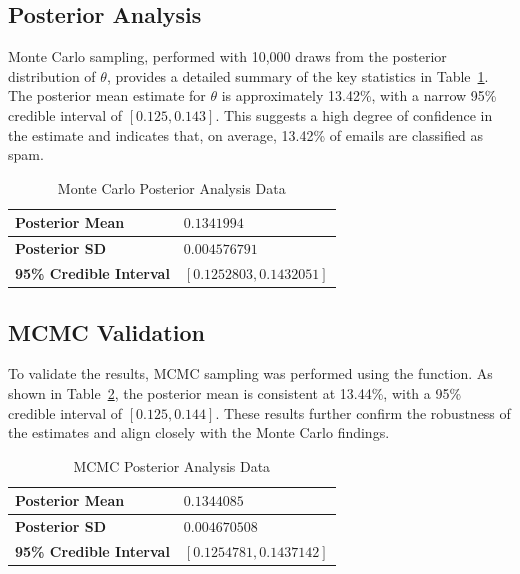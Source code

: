 \documentclass[12pt,a4paper]{article}
\begin{document}
\subsection{Posterior Analysis}\label{ssec:posterioranalysis}

Monte Carlo sampling, performed with 10,000 draws from the posterior distribution of $\theta$, provides a
detailed summary of the key statistics in Table~\ref{tab:posterioranalysistable}. The posterior mean estimate
for  $\theta$ is approximately 13.42\%, with a narrow 95\% credible interval of $[0.125,0.143]$. This
suggests a high degree of confidence in the estimate and indicates that, on average, 13.42\% of emails are
classified as spam.

\begin{longtable}[!ht]{p{4cm}|p{11cm}}
    \caption{Monte Carlo Posterior Analysis Data}   \\
    \label{tab:posterioranalysistable}  %
    \textbf{Posterior Mean} & $0.1341994$           \\
    \hline                              %
    \textbf{Posterior SD} & $0.004576791$           \\
    \hline                              %
    \textbf{95\% Credible Interval} & $[0.1252803, 0.1432051]$
\end{longtable}

\subsection{MCMC Validation}\label{ssec:mcmcvalidation}

To validate the results, MCMC sampling was performed using the  function. As shown in
Table~\ref{tab:mcmcposterioranalysistable}, the posterior mean is consistent at 13.44\%, with a 95\%
credible interval of $[0.125,0.144]$. These results further confirm the robustness of the estimates and
align closely with the Monte Carlo findings.

\begin{longtable}[!ht]{p{4cm}|p{11cm}}
    \caption{MCMC Posterior Analysis Data}  \\
    \label{tab:mcmcposterioranalysistable}  %
    \textbf{Posterior Mean} & $0.1344085$   \\
    \hline                                  %
    \textbf{Posterior SD} & $0.004670508$   \\
    \hline                                  %
    \textbf{95\% Credible Interval} & $[0.1254781, 0.1437142]$ 
\end{longtable}
\end{document}
